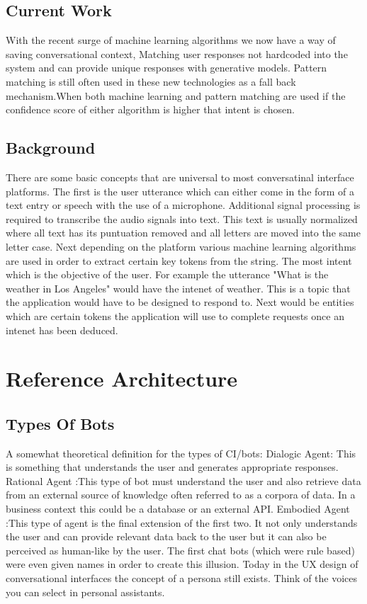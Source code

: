\documentclass[9pt,software]{livecoms}
\begin{document}
\subsection{Current Work}
With the recent surge of machine learning algorithms we now have a way of saving conversational context, Matching user responses not hardcoded into the system and can provide unique responses with generative models. Pattern matching is still often used in these new technologies as a fall back mechanism.When both machine learning and pattern matching are used if the confidence score of either algorithm is higher that intent is chosen. 

\subsection{Background}
There are some basic concepts that are universal to most conversatinal interface platforms. The first is the user utterance which can either come in 
the form of a text entry or speech with the use of a microphone. Additional signal processing is required to transcribe the audio signals into text. 
This text is usually normalized where all text has its puntuation removed and all letters are moved into the same letter case. Next depending on the 
platform various machine learning algorithms are used in order to extract certain key tokens from the string. The most intent which is the objective
of the user. For example the utterance "What is the weather in Los Angeles" would have the intenet of weather. This is a topic that the application
would have to be designed to respond to. Next would be entities which are certain tokens the application will use to complete requests once an intenet
has been deduced.

\section{Reference Architecture}
\subsection{Types Of Bots}
A somewhat theoretical definition for the types of CI/bots:                      
Dialogic Agent: This is something that understands the user and generates appropriate responses. 
Rational Agent :This type of bot must understand the user and also retrieve data from an external source of knowledge often referred to as a corpora of data. In a business context this could be a database or an external API.
Embodied Agent :This type of agent is the final extension of the first two. It not only understands the user and can provide relevant data back to the user but it can also be perceived as human-like by the user. The first chat bots (which were rule based) were even given names in order to create this illusion. Today in the UX design of conversational interfaces the concept of a persona still exists. Think of the voices you can select in personal assistants.
\end{document}
